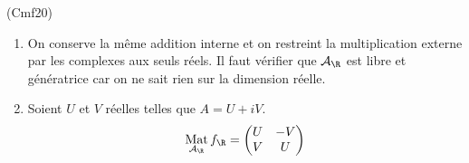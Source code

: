 \begin{tiny}(Cmf20)\end{tiny}
\begin{enumerate}
 \item On conserve la même addition interne et on restreint la multiplication externe par les complexes aux seuls réels. Il faut vérifier que $\mathcal{A}_\R$ est libre et génératrice car on ne sait rien sur la dimension réelle.
 \item Soient $U$ et $V$ réelles telles que $A=U+iV$. 
\begin{displaymath}
 \mathop{\mathrm{Mat}}_{\mathcal A_\R}f_\R
=
\begin{pmatrix}
 U & -V \\ V & U
\end{pmatrix}
\end{displaymath}
\end{enumerate}
  